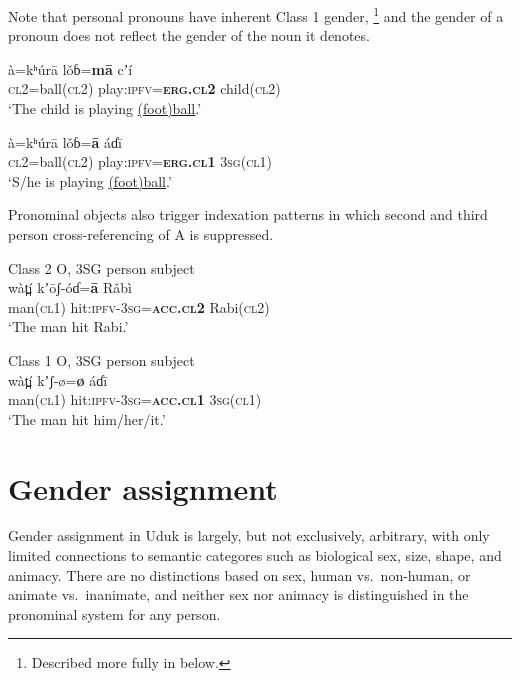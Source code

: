 \documentclass[output=collectionpaper,hidelinks]{langscibook}
\theoremstyle{remark}
\begin{document}
Note that personal pronouns have inherent Class 1 gender,%
\footnote{Described more fully in  below.} %
and the gender of a pronoun does not reflect the gender of the noun it denotes.

\ea
\gll  à=kʰúrā lǒɓ=\textbf{mā} cʼí \\
 \textsc{cl2}=ball(\textsc{cl2}) play:\textsc{ipfv}=\textbf{\textsc{erg.cl2}} child(\textsc{cl2}) \\
\glt `The child is playing \uline{(foot)ball}.' \\
\z

\ea
\gll  à=kʰúrā lǒɓ=\textbf{ā} áɗī \\
 \textsc{cl2}=ball(\textsc{cl2}) play:\textsc{ipfv}=\textbf{\textsc{erg.cl1}} \textsc{3sg}(\textsc{cl1}) \\
\glt `S/he is playing \uline{(foot)ball}.' \\
\z


Pronominal objects also trigger indexation patterns in which second and third person
cross-referencing of A is suppressed.

\ea
 Class 2 O, 3SG person subject \\
\gll wàt̪í kʼōʃ-óɗ=\textbf{ā} Rǎbì \\
 man(\textsc{cl1}) hit:\textsc{ipfv}-\textsc{3sg}=\textbf{\textsc{acc.cl2}} Rabi(\textsc{cl2}) \\
\glt `The man hit Rabi.' \\
\z

\ea
 Class 1 O, 3SG person subject \\
\gll wàt̪í kʼ\oMidHigh{}\hspace*{-0.4mm}ʃ-ø=\textbf{ø} áɗī \\
 man(\textsc{cl1}) hit:\textsc{ipfv}-\textsc{3sg}=\textbf{\textsc{acc.cl1}} \textsc{3sg}(\textsc{cl1}) \\
\glt `The man hit him/her/it.' \\
\z


\section{Gender assignment}
\label{sec:Assignment}

Gender assignment in Uduk is largely, but not exclusively, arbitrary, with only
limited connections to semantic categores such as biological sex, size, shape,
and animacy. There are no distinctions based on sex, human vs.\ non-human, or
animate vs.\ inanimate, and neither sex nor animacy is distinguished in the
pronominal system for any person.
\end{document}
